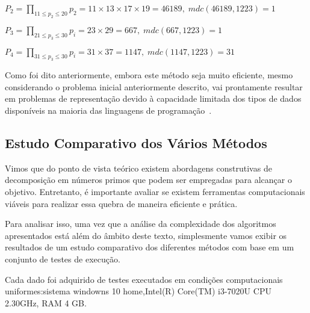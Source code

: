$P_2=\prod_{11\leq p_2 \leq 20}p_2=11\times 13 \times 17 \times 19=46189,\;mdc(46189,1223)=1$

$P_3=\prod_{21\leq p_3 \leq 30}p_i=23\times 29=667,\;mdc(667,1223)=1$

$P_4=\prod_{31\leq p_3 \leq 30}p_i=31\times 37=1147,\;mdc(1147,1223)=31$

Como foi dito anteriormente, embora este método seja muito eficiente, mesmo considerando o problema inicial anteriormente descrito, vai  prontamente resultar em problemas de representação devido à capacidade limitada dos tipos de dados disponíveis na maioria das linguagens de programação~\cite{Quaresma2009a}.

\subsection{Estudo Comparativo dos Vários Métodos}
\label{sec:EstudoComparativoVariosMetodos}

Vimos que do ponto de vista teórico existem abordagens construtivas de decomposição em números primos que podem ser empregadas para alcançar o objetivo. Entretanto, é importante avaliar se existem ferramentas computacionais viáveis para realizar essa quebra de maneira eficiente e prática.

Para analisar isso, uma vez que a análise da complexidade dos algoritmos apresentados está além do âmbito deste texto, simplesmente vamos exibir os resultados de um estudo comparativo dos diferentes métodos com base em um conjunto de testes de execução.

Cada dado foi adquirido de testes executados em condições computacionais uniformes:sistema windowns 10 home,Intel(R) Core(TM) i3-7020U CPU 2.30GHz, RAM 4 GB.

